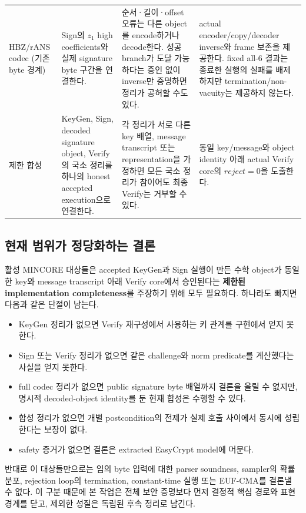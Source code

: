 \begin{longtable}{L{18mm}L{39mm}L{45mm}L{38mm}}
\addlinespace
HBZ/rANS codec (기존 byte 경계) &
Sign의 \(z_1\) high coefficients와 실제 signature byte 구간을 연결한다. &
순서·길이·offset 오류는 다른 object를 encode하거나 decode한다. 성공 branch가
도달 가능하다는 증인 없이 inverse만 증명하면 정리가 공허할 수도 있다. &
actual encoder/copy/decoder inverse와 frame 보존을 제공한다. fixed all-6 결과는
종료한 실행의 실패를 배제하지만 termination/non-vacuity는 제공하지 않는다. \\
\addlinespace
제한 합성 &
KeyGen, Sign, decoded signature object, Verify의 국소 정리를 하나의 honest
accepted execution으로 연결한다. &
각 정리가 서로 다른 key 배열, message transcript 또는 representation을
가정하면 모든 국소 정리가 참이어도 최종 Verify는 거부할 수 있다. &
동일 key/message와 object identity 아래 actual Verify core의
\(reject=0\)을 도출한다. \\
\bottomrule
\end{longtable}
\endgroup

\subsection{현재 범위가 정당화하는 결론}

활성 MINCORE 대상들은 accepted KeyGen과 Sign 실행이 만든 수학 object가 동일한
key와 message transcript 아래 Verify core에서 승인된다는
\textbf{제한된 implementation completeness}를 주장하기 위해 모두 필요하다.
하나라도 빠지면 다음과 같은 단절이 남는다.

\begin{itemize}
  \item KeyGen 정리가 없으면 Verify 재구성에서 사용하는 키 관계를 구현에서
        얻지 못한다.
  \item Sign 또는 Verify 정리가 없으면 같은 challenge와 norm predicate를
        계산했다는 사실을 얻지 못한다.
  \item full codec 정리가 없으면 public signature byte 배열까지 결론을 올릴 수
        없지만, 명시적 decoded-object identity를 둔 현재 합성은 수행할 수 있다.
  \item 합성 정리가 없으면 개별 postcondition의 전제가 실제 호출 사이에서
        동시에 성립한다는 보장이 없다.
  \item safety 증거가 없으면 결론은 extracted EasyCrypt model에 머문다.
\end{itemize}

반대로 이 대상들만으로는 임의 byte 입력에 대한 parser soundness, sampler의
확률분포, rejection loop의 termination, constant-time 실행 또는 EUF-CMA를
결론낼 수 없다. 이 구분 때문에 본 작업은 전체 보안 증명보다 먼저 결정적 핵심
경로와 표현 경계를 닫고, 제외한 성질은 독립된 후속 정리로 남긴다.

